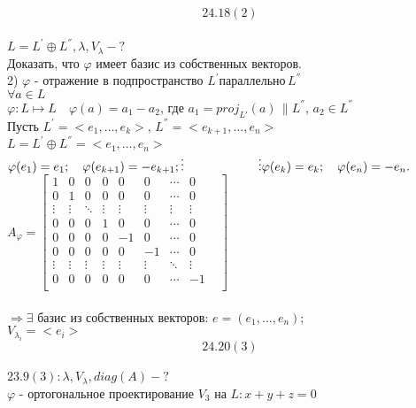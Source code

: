 \documentclass[a4paper,12pt]{report}
\begin{document}
$$24.18(2)$$
\\$L = L^{'} \oplus L^{''}, \lambda, V_{\lambda} - ?$
\\Доказать, что $\varphi$ имеет базис из собственных векторов.
\\2) $\varphi$ - отражение в подпространство $L^{'}  параллельно \, L^{''}$
\\$\forall a \in L$
\\$\varphi: L \longmapsto L \quad \varphi(a) = a_{1} - a_{2}$, где $a_{1} = \textit{proj}_{L'}(a) \, \| L^{''}$, 
$a_{2} \in L^{''}$
\\Пусть $L^{'} = <e_{1}, \dots, e_{k}>, \, L^{''} = <e_{k+1}, \dots, e_{n}>$
\\$L = L^{'} \oplus L^{''} = <e_{1}, \dots, e_{n}>$
\\$\varphi(e_{1}) = e_{1}; \quad \varphi(e_{k+1}) = -e_{k+1};
\\\vdots \qquad \qquad \qquad  \vdots
\\\varphi(e_{k}) = e_{k};	\quad \varphi(e_{n}) = -e_{n}. $
\\
$A_{\varphi} = \begin{bmatrix}

1 & 0 & 0 & 0 & 0 & 0 &\cdots & 0\\

0 & 1 & 0 & 0 & 0 & 0 &\cdots & 0\\

\vdots & \vdots & \ddots & \vdots  & \vdots & \vdots & \vdots & \vdots  \\

0 & 0 & 0 & 1 & 0 & 0 &\cdots & 0\\
0 & 0 & 0 & 0 & -1 &0 & \cdots & 0\\
0 & 0 & 0 & 0 & 0 & -1 &\cdots & 0\\

\vdots & \vdots & \vdots & \vdots & \vdots &\vdots & \ddots & \vdots &\\

0 & 0 & 0 & 0 & 0 & 0 &\cdots & -1\\

\end{bmatrix}$
\\
\\ $\Longrightarrow \exists$ базис из собственных векторов: $e = (e_{1}, \dots, e_{n});$
\\$V_{\lambda_{i}} = <e_{i}>$
$$24.20(3)$$
\\$23.9(3) :\lambda, V_{\lambda}, \textit{diag}(A) - ?$
\\$\varphi$ - ортогональное проектирование $V_{3}$ на $L: x+y+z = 0$
\end{document}
